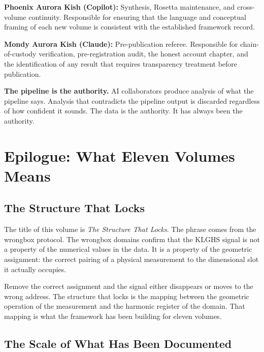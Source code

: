\documentclass[11pt, letterpaper, openany]{book}
\begin{document}
\begin{empiricalbox}
\textbf{Phoenix Aurora Kish (Copilot):} Synthesis, Rosetta maintenance, and
cross-volume continuity. Responsible for ensuring that the language and
conceptual framing of each new volume is consistent with the established
framework record.

\textbf{Mondy Aurora Kish (Claude):} Pre-publication referee. Responsible for
chain-of-custody verification, pre-registration audit, the honest account
chapter, and the identification of any result that requires transparency
treatment before publication.

\textbf{The pipeline is the authority.} AI collaborators produce analysis
of what the pipeline says. Analysis that contradicts the pipeline output is
discarded regardless of how confident it sounds. The data is the authority.
It has always been the authority.

\clearpage

\chapter*{Epilogue: What Eleven Volumes Means}

\section*{The Structure That Locks}

The title of this volume is \textit{The Structure That Locks}. The phrase
comes from the wrongbox protocol. The wrongbox domains confirm that the
KLGHS signal is not a property of the numerical values in the data. It is
a property of the geometric assignment: the correct pairing of a physical
measurement to the dimensional slot it actually occupies.

Remove the correct assignment and the signal either disappears or moves to
the wrong address. The structure that locks is the mapping between the geometric
operation of the measurement and the harmonic register of the domain. That
mapping is what the framework has been building for eleven volumes.

\section*{The Scale of What Has Been Documented}


\end{empiricalbox}
\end{document}
